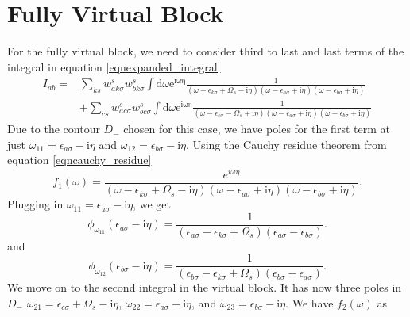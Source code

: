 \documentclass[12pt]{caltech_thesis}
\begin{document}
\section{Fully Virtual Block}
For the fully virtual block, we need to consider third to last and last terms of the integral in equation \ref{eqnexpanded_integral}
\begin{equation}
\begin{aligned}
I_{ab} =& \sum_{ks} w_{a k \sigma}^s w_{b k \sigma}^s \int \mathrm{d} \omega \mathrm{e}^{\mathrm{i \omega \eta}} \frac{1}{(\omega-\epsilon_{k \sigma}+\Omega_s-\mathrm{i} \eta)(\omega-\epsilon_{a \sigma}+\mathrm{i} \eta)(\omega-\epsilon_{b \sigma}+\mathrm{i} \eta)}\\
& + \sum_{cs} w_{a c \sigma}^s w_{b c \sigma}^s \int \mathrm{d} \omega \mathrm{e}^{\mathrm{i \omega \eta}} \frac{1}{(\omega-\epsilon_{c \sigma}-\Omega_s+\mathrm{i} \eta)(\omega-\epsilon_{a \sigma}+\mathrm{i} \eta)(\omega-\epsilon_{b \sigma}+\mathrm{i} \eta)}
\end{aligned}
\end{equation}
Due to the contour $D_-$ chosen for this case, we have poles for the first term at just $\omega_{11} = \epsilon _{a \sigma } - \mathrm{i} \eta$ and $\omega_{12} = \epsilon _{b \sigma } - \mathrm{i} \eta$. Using the Cauchy residue theorem from equation \ref{eqncauchy_residue}
\begin{equation}
f_1(\omega) = \frac{e^{i\omega \eta }}{(\omega-\epsilon_{k \sigma}+\Omega_s-\mathrm{i} \eta)(\omega-\epsilon_{a \sigma}+\mathrm{i} \eta)(\omega-\epsilon_{b \sigma}+\mathrm{i} \eta)}.    
\end{equation}
Plugging in $\omega_{11} = \epsilon _{a \sigma } - \mathrm{i} \eta$, we get
\begin{equation}
\phi_{\omega_{11}}(\epsilon_{a \sigma} - \mathrm{i} \eta) = \frac{1}{(\epsilon_{a \sigma} -\epsilon_{k \sigma}+\Omega_s)(\epsilon_{a \sigma} -\epsilon_{b \sigma})}.    
\end{equation}
and
\begin{equation}
\phi_{\omega_{12}}(\epsilon_{b \sigma} - \mathrm{i} \eta) = \frac{1}{(\epsilon_{b \sigma} -\epsilon_{k \sigma}+\Omega_s)(\epsilon_{b \sigma} -\epsilon_{a \sigma})}.    
\end{equation}
We move on to the second integral in the virtual block. It has now three poles in $D_-$ $\omega_{21} = \epsilon _{c\sigma } + \Omega_s - \mathrm{i} \eta$, $\omega_{22} = \epsilon _{a\sigma } - \mathrm{i} \eta$, and $\omega_{23} = \epsilon _{b\sigma } - \mathrm{i} \eta$. We have $f_2(\omega)$ as
\end{document}
